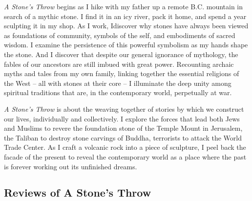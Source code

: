 \documentclass[10pt,DIV09,letterpaper,oneside,headsepline]{scrreprt}
\begin{document}
\textit{A Stone's Throw} begins as I hike with my father up a remote B.C. mountain in search of a mythic stone. I find it in an icy river, pack it home, and spend a year sculpting it in my shop. As I work, Idiscover why stones have always been viewed as foundations of community, symbols of the self, and embodiments of sacred wisdom. I examine the persistence of this powerful symbolism as my hands shape the stone. And I discover that despite our general ignorance of mythology, the fables of our ancestors are still imbued with great power. Recounting archaic myths and tales from my own family, linking together the essential religions of the West -- all with stones at their core -- I illuminate the deep unity among spiritual traditions that are, in the contemporary world, perpetually at war.

\textit{A Stone's Throw} is about the weaving together of stories by which we construct our lives, individually and collectively. I explore the forces that lead both Jews and Muslims to revere the foundation stone of the Temple Mount in Jerusalem, the Taliban to destroy stone carvings of Buddha, terrorists to attack the World Trade Center. As I craft a volcanic rock into a piece of sculpture, I peel back the facade of the present to reveal the contemporary world as a place where the past is forever working out its unfinished dreams.

\subsection{Reviews of A Stone's Throw}
\end{document}
